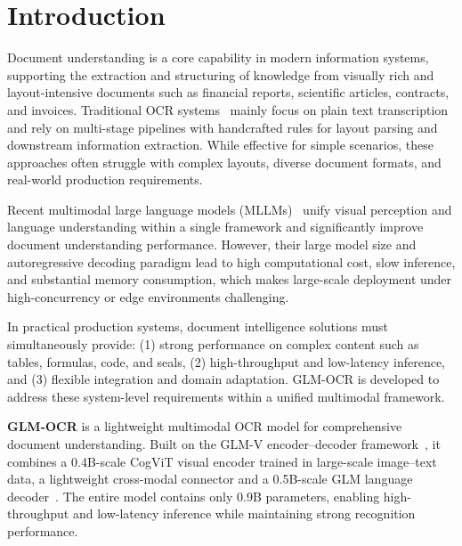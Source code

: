 \section{Introduction}

Document understanding is a core capability in modern information systems, supporting the extraction and structuring of knowledge from visually rich and layout-intensive documents such as financial reports, scientific articles, contracts, and invoices. Traditional OCR systems~\cite{Tesseract,EasyOCR,PaddleOCR} mainly focus on plain text transcription and rely on multi-stage pipelines with handcrafted rules for layout parsing and downstream information extraction. While effective for simple scenarios, these approaches often struggle with complex layouts, diverse document formats, and real-world production requirements.

Recent multimodal large language models (MLLMs)~\cite{Qwen3-VL,glm-4.5v,seed1_5vl} unify visual perception and language understanding within a single framework and significantly improve document understanding performance. However, their large model size and autoregressive decoding paradigm lead to high computational cost, slow inference, and substantial memory consumption, which makes large-scale deployment under high-concurrency or edge environments challenging.

In practical production systems, document intelligence solutions must simultaneously provide: (1) strong performance on complex content such as tables, formulas, code, and seals, (2) high-throughput and low-latency inference, and (3) flexible integration and domain adaptation. GLM-OCR is developed to address these system-level requirements within a unified multimodal framework.

\textbf{GLM-OCR} is a lightweight multimodal OCR model for comprehensive document understanding. Built on the GLM-V encoder–decoder framework~\cite{glm-4.5v}, it combines a 0.4B-scale CogViT visual encoder trained in large-scale image–text data, a lightweight cross-modal connector and a 0.5B-scale GLM language decoder~\cite{glm2024chatglm}. The entire model contains only 0.9B parameters, enabling high-throughput and low-latency inference while maintaining strong recognition performance.

